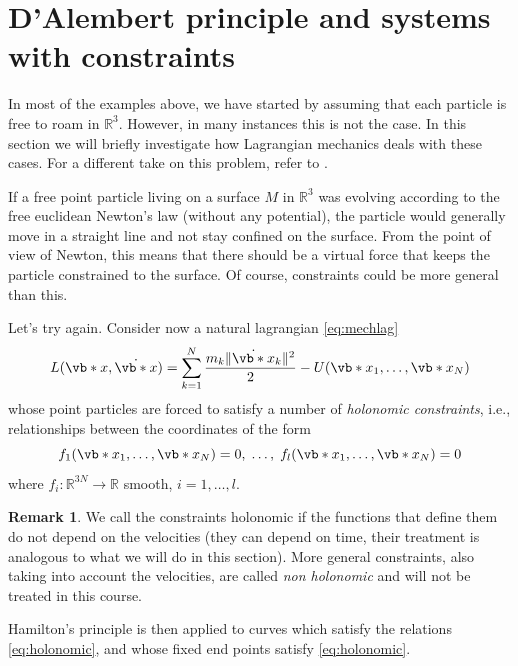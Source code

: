 \documentclass[english,fontsize=11pt,paper=b5]{scrbook}
\numberwithin{equation}{chapter}
\theoremstyle{definition}
\newtheorem{remark}{Remark}[chapter]
\begin{document}
    \section{D'Alembert principle and systems with constraints}\label{sec:LagrangeConstraints}

    In most of the examples above, we have started by assuming that each particle is free to roam in $\mathbb{R}^3$.
    However, in many instances this is not the case.
    In this section we will briefly investigate how Lagrangian mechanics deals with these cases. For a different take on this problem, refer to \cite[Chapter 21]{book:arnold}.

    If a free point particle living on a surface $M$ in $\mathbb{R}^3$ was evolving according to the free euclidean Newton's law (without any potential), the particle would generally move in a straight line and not stay confined on the surface.
    From the point of view of Newton, this means that there should be a virtual force that keeps the particle constrained to the surface. Of course, constraints could be more general than this.

    Let's try again. Consider now a natural lagrangian \eqref{eq:mechlag}
    \begin{equation}
      L(\vb*{x}, \dot{\vb*{x}}) = \sum_{k=1}^N \frac{m_k \|\dot{\vb*{x}}_k\|^2}{2} - U(\vb*{x}_1, \ldots, \vb*{x}_N)
    \end{equation}
    whose point particles are forced to satisfy a number of \emph{holonomic constraints}, i.e., relationships between the coordinates of the form
    \begin{equation}\label{eq:holonomic}
      f_1(\vb*{x}_1, \ldots,\vb*{x}_N) = 0, \;\ldots,\; f_l(\vb*{x}_1, \ldots,\vb*{x}_N) = 0
    \end{equation}
    where $f_i : \mathbb{R}^{3N}\to\mathbb{R}$ smooth, $i=1,\ldots,l$.

    \begin{remark}
      We call the constraints holonomic if the functions that define them do not depend on the velocities (they can depend on time, their treatment is analogous to what we will do in this section). More general constraints, also taking into account the velocities, are called \emph{non holonomic} and will not be treated in this course.
    \end{remark}

    Hamilton's principle is then applied to curves which satisfy the relations \eqref{eq:holonomic}, and whose fixed end points satisfy \eqref{eq:holonomic}.
\end{document}
